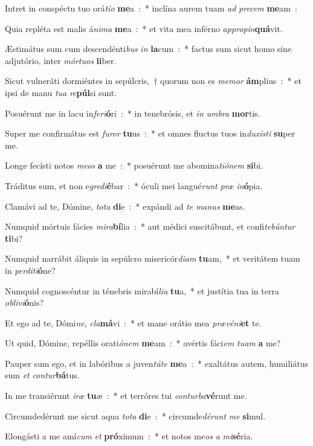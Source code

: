 ﻿\item Intret in conspéctu tuo orá\emph{ti}\emph{o} \textbf{me}a~:~* inclína aurem tuam \emph{ad} \emph{pre}\emph{cem} \textbf{me}am~:
\item Quia repléta est malis á\emph{ni}\emph{ma} \textbf{me}a~:~* et vita mea inférno \emph{ap}\emph{pro}\emph{pin}\textbf{quá}vit.
\item Æstimátus sum cum descendénti\emph{bus} \emph{in} \textbf{la}cum~:~* factus sum sicut homo sine adjutório, inter \emph{mór}\emph{tu}\emph{os} \textbf{li}ber.
\item Sicut vulneráti dormiéntes in sepúlcris,~† quorum non es \emph{me}\emph{mor} \textbf{ám}plius~:~* et ipsi de manu \emph{tu}\emph{a} \emph{re}\textbf{púl}si sunt.
\item Posuérunt me in lacu in\emph{fe}\emph{ri}\textbf{ó}ri~:~* in tenebrósis, et \emph{in} \emph{um}\emph{bra} \textbf{mor}tis.
\item Super me confirmátus est \emph{fu}\emph{ror} \textbf{tu}us~:~* et omnes fluctus tuos in\emph{du}\emph{xí}\emph{sti} \textbf{su}per me.\ifx\lalinebreakafterseven\undefined\else\\\fi
\item Longe fecísti notos \emph{me}\emph{os} \textbf{a} me~:~* posuérunt me abomina\emph{ti}\emph{ó}\emph{nem} \textbf{si}bi.
\item Tráditus sum, et non e\emph{gre}\emph{di}\textbf{é}bar~:~* óculi mei langué\emph{runt} \emph{præ} \emph{in}\textbf{ó}pia.
\item Clamávi ad te, Dómine, \emph{to}\emph{ta} \textbf{di}e~:~* expándi ad \emph{te} \emph{ma}\emph{nus} \textbf{me}as.
\item Numquid mórtuis fácies \emph{mi}\emph{ra}\textbf{bí}lia~:~* aut médici suscitábunt, et confi\emph{te}\emph{bún}\emph{tur} \textbf{ti}bi?
\item Numquid narrábit áliquis in sepúlcro misericór\emph{di}\emph{am} \textbf{tu}am,~* et veritátem tuam in \emph{per}\emph{di}\emph{ti}\textbf{ó}ne?
\item Numquid cognoscéntur in ténebris mirabí\emph{li}\emph{a} \textbf{tu}a,~* et justítia tua in terra \emph{o}\emph{bli}\emph{vi}\textbf{ó}nis?
\item Et ego ad te, Dómi\emph{ne}, \emph{cla}\textbf{má}vi~:~* et mane orátio mea \emph{præ}\emph{vé}\emph{ni}\textbf{et} te.
\item Ut quid, Dómine, repéllis orati\emph{ó}\emph{nem} \textbf{me}am~:~* avértis fáci\emph{em} \emph{tu}\emph{am} \textbf{a} me?
\item Pauper sum ego, et in labóribus a juven\emph{tú}\emph{te} \textbf{me}a~:~* exaltátus autem, humiliátus sum \emph{et} \emph{con}\emph{tur}\textbf{bá}tus.
\item In me transiérunt \emph{i}\emph{ræ} \textbf{tu}æ~:~* et terróres tui \emph{con}\emph{tur}\emph{ba}\textbf{vé}runt me.
\item Circumdedérunt me sicut aqua \emph{to}\emph{ta} \textbf{di}e~:~* circumde\emph{dé}\emph{runt} \emph{me} \textbf{si}mul.
\item Elongásti a me amí\emph{cum} \emph{et} \textbf{pró}ximum~:~* et notos me\emph{os} \emph{a} \emph{mi}\textbf{sé}ria.